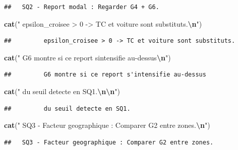 \documentclass[
]{article}
\newenvironment{Shaded}{\begin{snugshade}}{\end{snugshade}}
\newcommand{\FunctionTok}[1]{\textcolor[rgb]{0.13,0.29,0.53}{\textbf{#1}}}
\newcommand{\NormalTok}[1]{#1}
\newcommand{\SpecialCharTok}[1]{\textcolor[rgb]{0.81,0.36,0.00}{\textbf{#1}}}
\newcommand{\StringTok}[1]{\textcolor[rgb]{0.31,0.60,0.02}{#1}}
\begin{document}
\begin{verbatim}
##   SQ2 - Report modal : Regarder G4 + G6.
\end{verbatim}

\begin{Shaded}
\begin{Highlighting}[]
\FunctionTok{cat}\NormalTok{(}\StringTok{"        epsilon\_croisee \textgreater{} 0 {-}\textgreater{} TC et voiture sont substituts.}\SpecialCharTok{\textbackslash{}n}\StringTok{"}\NormalTok{)}
\end{Highlighting}
\end{Shaded}

\begin{verbatim}
##         epsilon_croisee > 0 -> TC et voiture sont substituts.
\end{verbatim}

\begin{Shaded}
\begin{Highlighting}[]
\FunctionTok{cat}\NormalTok{(}\StringTok{"        G6 montre si ce report s\textquotesingle{}intensifie au{-}dessus}\SpecialCharTok{\textbackslash{}n}\StringTok{"}\NormalTok{)}
\end{Highlighting}
\end{Shaded}

\begin{verbatim}
##         G6 montre si ce report s'intensifie au-dessus
\end{verbatim}

\begin{Shaded}
\begin{Highlighting}[]
\FunctionTok{cat}\NormalTok{(}\StringTok{"        du seuil detecte en SQ1.}\SpecialCharTok{\textbackslash{}n\textbackslash{}n}\StringTok{"}\NormalTok{)}
\end{Highlighting}
\end{Shaded}

\begin{verbatim}
##         du seuil detecte en SQ1.
\end{verbatim}

\begin{Shaded}
\begin{Highlighting}[]
\FunctionTok{cat}\NormalTok{(}\StringTok{"  SQ3 {-} Facteur geographique : Comparer G2 entre zones.}\SpecialCharTok{\textbackslash{}n}\StringTok{"}\NormalTok{)}
\end{Highlighting}
\end{Shaded}

\begin{verbatim}
##   SQ3 - Facteur geographique : Comparer G2 entre zones.
\end{verbatim}
\end{document}
